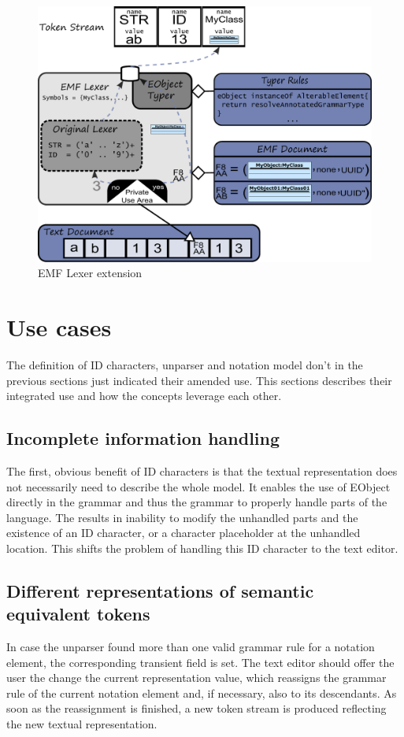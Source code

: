 \begin{figure}
\centering
\includegraphics[scale=0.55]{gfx/ex/Lexer} 
\caption{EMF Lexer extension}
\end{figure}


\section{Use cases}
The definition of ID characters, unparser and notation model don't in the previous sections just indicated their amended use. This sections describes their integrated use and how the concepts leverage each other. 

\subsection{Incomplete information handling}
The first, obvious benefit of ID characters is that the textual representation does not necessarily need to describe the whole model. It enables the use of EObject directly in the grammar and thus the grammar to properly handle parts of the language. The results in inability to modify the unhandled parts and the existence of an ID character, or a character placeholder at the unhandled location. This shifts the problem of handling this ID character to the text editor.

\subsection{Different representations of semantic equivalent tokens}
In case the unparser found more than one valid grammar rule for a notation element, the corresponding transient field is set. The text editor should offer the user the change the current representation value, which reassigns the grammar rule of the current notation element and, if necessary, also to its descendants. As soon as the reassignment is finished, a new token stream is produced reflecting the new textual representation.


